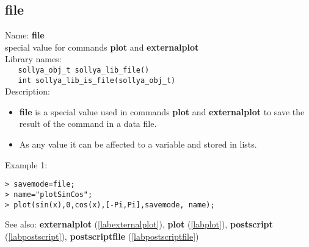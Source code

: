 \subsection{file}
\label{labfile}
\noindent Name: \textbf{file}\\
\phantom{aaa}special value for commands \textbf{plot} and \textbf{externalplot}\\[0.2cm]
\noindent Library names:\\
\verb|   sollya_obj_t sollya_lib_file()|\\
\verb|   int sollya_lib_is_file(sollya_obj_t)|\\[0.2cm]
\noindent Description: \begin{itemize}

\item \textbf{file} is a special value used in commands \textbf{plot} and \textbf{externalplot} to save
   the result of the command in a data file.

\item As any value it can be affected to a variable and stored in lists.
\end{itemize}
\noindent Example 1: 
\begin{center}\begin{minipage}{15cm}\begin{Verbatim}[frame=single]
> savemode=file;
> name="plotSinCos";
> plot(sin(x),0,cos(x),[-Pi,Pi],savemode, name);
\end{Verbatim}
\end{minipage}\end{center}
See also: \textbf{externalplot} (\ref{labexternalplot}), \textbf{plot} (\ref{labplot}), \textbf{postscript} (\ref{labpostscript}), \textbf{postscriptfile} (\ref{labpostscriptfile})
